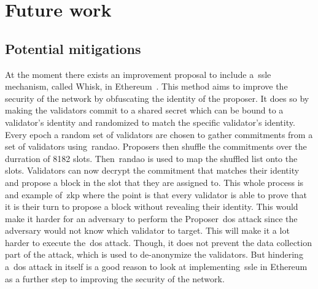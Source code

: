 

\section{Future work}\label{sec:future-works}

\subsection{Potential mitigations}\label{subsec:potential-mitigations}
At the moment there exists an improvement proposal
to include a~\gls{ssle} mechanism, called Whisk, in Ethereum~\cite{EthereumResearchSSLE2024}.
This method aims to improve the security of the network by obfuscating the identity of the proposer.
It does so by making the validators commit to a shared secret which can be bound to a validator's identity and randomized to match the specific validator's identity.
Every epoch a random set of validators are chosen to gather commitments from a set of validators using~\gls{randao}.
Proposers then shuffle the commitments over the durration of 8182 slots.
Then~\gls{randao} is used to map the shuffled list onto the slots.
Validators can now decrypt the commitment that matches their identity and propose a block in the slot that they are assigned to.
This whole process is and example of~\gls{zkp} where the point is that every validator is able to prove that it is their turn to propose a block without revealing their identity.
This would make it harder
for an adversary to perform the Proposer~\gls{dos} attack since the adversary would not know which validator to target.
This will make it a lot harder to execute the~\gls{dos} attack.
Though, it does not prevent the data collection part of the attack, which is used to de-anonymize the validators.
But hindering a~\gls{dos} attack in itself is a good reason
to look at implementing~\gls{ssle} in Ethereum as a further step to improving the security of the network.
